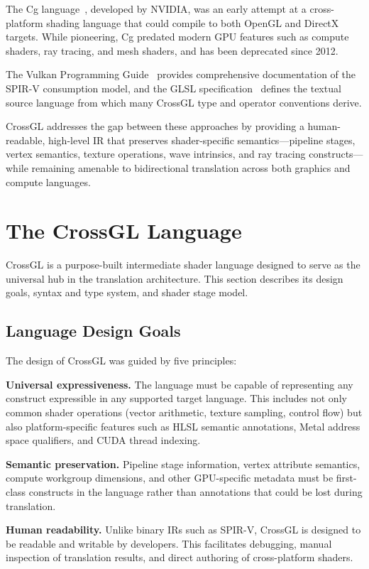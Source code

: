 \documentclass{svproc}
\begin{document}
The Cg language~\cite{mark2003cg}, developed by NVIDIA, was an early attempt at a cross-platform shading language that could compile to both OpenGL and DirectX targets. While pioneering, Cg predated modern GPU features such as compute shaders, ray tracing, and mesh shaders, and has been deprecated since 2012.

The Vulkan Programming Guide~\cite{sellers2017vulkan} provides comprehensive documentation of the SPIR-V consumption model, and the GLSL specification~\cite{kessenich2018glsl} defines the textual source language from which many CrossGL type and operator conventions derive.

CrossGL addresses the gap between these approaches by providing a human-readable, high-level IR that preserves shader-specific semantics---pipeline stages, vertex semantics, texture operations, wave intrinsics, and ray tracing constructs---while remaining amenable to bidirectional translation across both graphics and compute languages.
\section{The CrossGL Language}

CrossGL is a purpose-built intermediate shader language designed to serve as the universal hub in the translation architecture. This section describes its design goals, syntax and type system, and shader stage model.

\subsection{Language Design Goals}

The design of CrossGL was guided by five principles:

\textbf{Universal expressiveness.} The language must be capable of representing any construct expressible in any supported target language. This includes not only common shader operations (vector arithmetic, texture sampling, control flow) but also platform-specific features such as HLSL semantic annotations, Metal address space qualifiers, and CUDA thread indexing.

\textbf{Semantic preservation.} Pipeline stage information, vertex attribute semantics, compute workgroup dimensions, and other GPU-specific metadata must be first-class constructs in the language rather than annotations that could be lost during translation.

\textbf{Human readability.} Unlike binary IRs such as SPIR-V, CrossGL is designed to be readable and writable by developers. This facilitates debugging, manual inspection of translation results, and direct authoring of cross-platform shaders.
\end{document}

